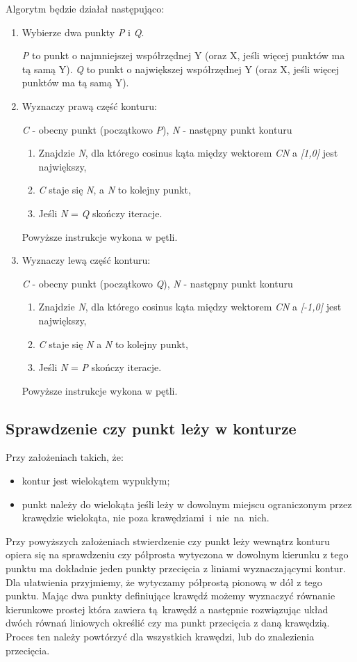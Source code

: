 \documentclass[a4paper,11pt]{article}
\begin{document}
\noindent
Algorytm będzie działał następująco:
\begin{enumerate}
\item Wybierze dwa punkty \textit{P} i \textit{Q}.

\textit{P} to punkt o najmniejszej współrzędnej Y (oraz X, jeśli więcej punktów ma tą samą Y). \textit{Q} to punkt o największej współrzędnej Y (oraz X, jeśli więcej punktów ma tą samą Y).

\item Wyznaczy prawą część konturu:

\textit{C} - obecny punkt (początkowo \textit{P}), \textit{N} - następny punkt konturu 
\begin{enumerate}
\item Znajdzie \textit{N}, dla którego cosinus kąta między wektorem \textit{CN} a\textit{ [1,0]} jest największy,
\item \textit{C} staje się \textit{N}, a \textit{N} to kolejny punkt,
\item Jeśli \textit{N} = \textit{Q} skończy iteracje.
\end{enumerate}
Powyższe instrukcje wykona w pętli.

\item Wyznaczy lewą część konturu:

\textit{C} - obecny punkt (początkowo \textit{Q}), \textit{N} - następny punkt konturu 
\begin{enumerate}
\item Znajdzie \textit{N}, dla którego cosinus kąta między wektorem \textit{CN} a\textit{ [-1,0]} jest największy,
\item \textit{C} staje się \textit{N} a \textit{N} to kolejny punkt,
\item Jeśli \textit{N} = \textit{P} skończy iteracje.
\end{enumerate}
Powyższe instrukcje wykona w pętli.
\end{enumerate}

\subsection{Sprawdzenie czy punkt leży w konturze}
Przy założeniach takich, że:
\begin{itemize}
\item kontur jest wielokątem wypukłym;
\item punkt należy do wielokąta jeśli leży w dowolnym miejscu ograniczonym przez krawędzie wielokąta, nie poza krawędziami~i~nie~na~nich.
\end{itemize}
Przy powyższych założeniach stwierdzenie czy punkt leży wewnątrz konturu opiera się na sprawdzeniu czy półprosta wytyczona w dowolnym kierunku z tego punktu ma dokładnie jeden punkty przecięcia z liniami wyznaczającymi kontur. Dla ułatwienia przyjmiemy, że wytyczamy półprostą pionową w dół z tego punktu. Mając dwa punkty definiujące krawędź możemy wyznaczyć równanie kierunkowe prostej która zawiera tą~krawędź a następnie rozwiązując układ dwóch równań liniowych określić czy ma punkt przecięcia z daną krawędzią. Proces ten należy powtórzyć dla wszystkich krawędzi, lub do znalezienia przecięcia.
 
\end{document}
